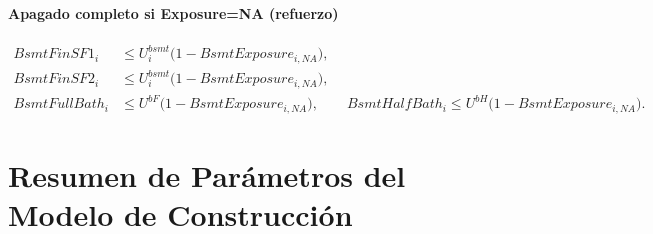 \paragraph{Apagado completo si Exposure=NA (refuerzo)}
\begin{align}
BsmtFinSF1_i &\le U^{bsmt}_i \big(1 - BsmtExposure_{i,NA}\big),\\
BsmtFinSF2_i &\le U^{bsmt}_i \big(1 - BsmtExposure_{i,NA}\big),\\
BsmtFullBath_i &\le U^{bF}\big(1 - BsmtExposure_{i,NA}\big),\qquad
BsmtHalfBath_i \le U^{bH}\big(1 - BsmtExposure_{i,NA}\big).
\end{align}

\section*{Resumen de Parámetros del Modelo de Construcción}

